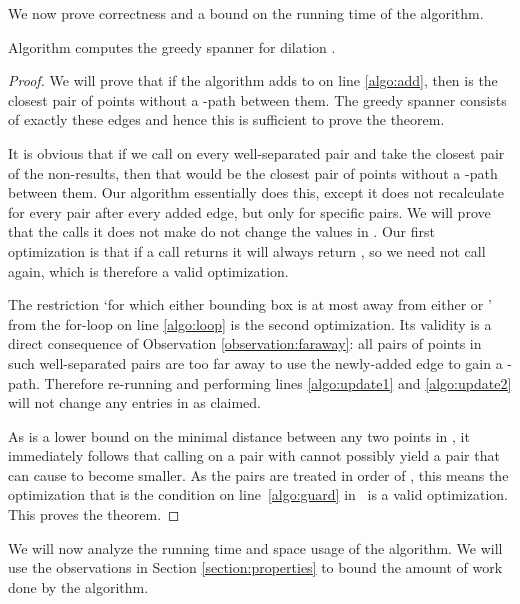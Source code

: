 \documentclass[runningheads,envcountsame,oribibl,orivec]{llncs}
\begin{document}
\pagebreak

We now prove correctness and a bound on the running time of the algorithm.

\begin{theorem} \label{theorem:correctness}
Algorithm  computes the greedy spanner for dilation .
\end{theorem}

\begin{proof}
We will prove that if the algorithm adds  to  on line \ref{algo:add}, then  is the closest pair of points without a -path between them. The greedy spanner consists of exactly these edges and hence this is sufficient to prove the theorem.

It is obvious that if we call  on every well-separated pair and take the closest pair of the non-\qnil results, then that would be the closest pair of points without a -path between them. Our algorithm essentially does this, except it does not recalculate  for every pair after every added edge, but only for specific pairs. We will prove that the calls it does not make do not change the values in . Our first optimization is that if a call  returns \qnil it will always return \qnil, so we need not call  again, which is therefore a valid optimization.

The restriction `for which either bounding box is at most  away from either  or ' from the for-loop on line \ref{algo:loop} is the second optimization. Its validity is a direct consequence of Observation \ref{observation:faraway}: all pairs of points in such well-separated pairs are too far away to use the newly-added edge to gain a -path. Therefore re-running  and performing lines \ref{algo:update1} and \ref{algo:update2} will not change any entries in  as claimed.

As  is a lower bound on the minimal distance between any two points  in , it immediately follows that calling  on a pair  with  cannot possibly yield a pair that can cause  to become smaller. As the pairs are treated in order of , this means the optimization that is the condition on line~\ref{algo:guard} in~ is a valid optimization. This proves the theorem.
\end{proof}

We will now analyze the running time and space usage of the algorithm. We will use the observations in Section \ref{section:properties} to bound the amount of work done by the algorithm.
\end{document}
